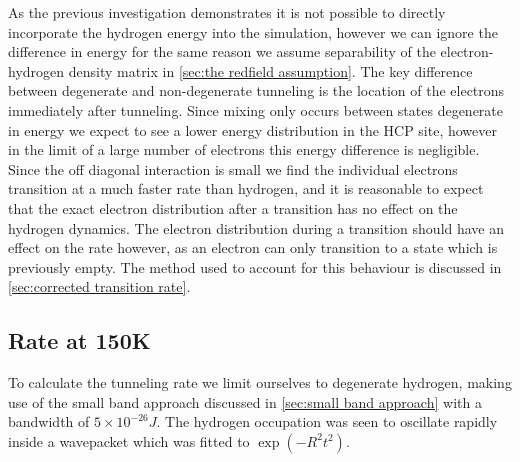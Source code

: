 
As the previous investigation
demonstrates it is
not possible to directly
incorporate the hydrogen energy
into the simulation,
however we can ignore the
difference in energy
for the same reason we
assume separability
of the electron-hydrogen
density matrix in
\cref{sec:the redfield assumption}.
The key difference
between degenerate and
non-degenerate tunneling
is the location of the
electrons
immediately after
tunneling. Since
mixing only occurs
between states degenerate
in energy we expect
to see a lower energy
distribution in the
HCP site, however
in the
limit of a large
number of electrons
this energy
difference is negligible.
Since the off diagonal
interaction is small we
find the
individual electrons
transition at a much
faster rate than
hydrogen, and it is
reasonable
to expect that
the exact electron
distribution after a
transition has no effect
on the hydrogen dynamics.
The electron distribution
during a transition
should have an effect on the
rate however, as an electron can
only transition to a state
which is previously
empty. The method used to
account for this behaviour
is discussed in
\cref{sec:corrected transition rate}.

\subsection{Rate at 150K}\label{sec:degenerate tunnelling simulaton}
To calculate the tunneling rate
we limit
ourselves to degenerate
hydrogen, making use of
the small band approach
discussed in \cref{sec:small band approach}
with a bandwidth of
\(5\times{}10^{-26}J\).
The hydrogen occupation
was seen to oscillate
rapidly inside a wavepacket
which was fitted to
\(\exp{(- R^2t^2)}\).

